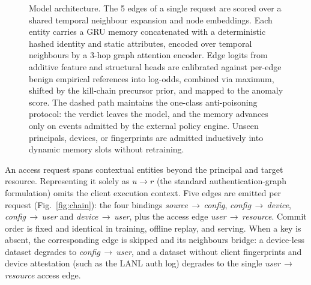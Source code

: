 \begin{figure}[ht!]
\caption{Model architecture. The 5 edges of a single request are scored over a shared
temporal neighbour expansion and node embeddings. Each entity carries a GRU memory concatenated
with a deterministic hashed identity and static attributes, encoded over temporal neighbours by
a 3-hop graph attention encoder. Edge logits from additive feature and structural heads are
calibrated against per-edge benign empirical references into log-odds, combined via maximum, shifted
by the kill-chain precursor prior, and mapped to the anomaly score. The dashed path maintains the
one-class anti-poisoning protocol: the verdict leaves the model, and the memory advances only on
events admitted by the external policy engine. Unseen principals, devices, or fingerprints are
admitted inductively into dynamic memory slots without retraining.}
\label{fig:arch}
\end{figure}

An access request spans contextual entities beyond the principal and target resource.
Representing it solely as $u \rightarrow r$ (the standard authentication-graph formulation)
omits the client execution context. Five edges are emitted per request (Fig.~\ref{fig:chain}): the four bindings
\textit{source}\,$\rightarrow$\,\textit{config},
\textit{config}\,$\rightarrow$\,\textit{device},
\textit{config}\,$\rightarrow$\,\textit{user} and
\textit{device}\,$\rightarrow$\,\textit{user}, plus the access edge
\textit{user}\,$\rightarrow$\,\textit{resource}. Commit order is fixed and identical in
training, offline replay, and serving. When a key is absent, the corresponding edge is
skipped and its neighbours bridge: a device-less dataset degrades to
\textit{config}\,$\rightarrow$\,\textit{user}, and a dataset without client fingerprints
and device attestation (such as the LANL auth log) degrades to the single
\textit{user}\,$\rightarrow$\,\textit{resource} access edge.

